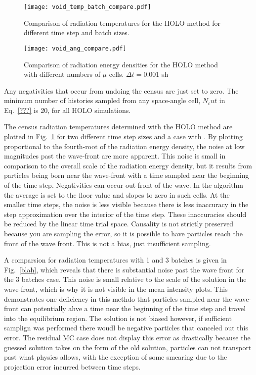 \begin{figure}[H]
  \centering
    \texttt{[image: void\_temp\_batch\_compare.pdf]}
    \caption{\label{fig:void_temp_compare} Comparison of radiation temperatures for the
    HOLO method for different time step and batch sizes.}
\end{figure}

\begin{figure}[H]
  \centering
    \texttt{[image: void\_ang\_compare.pdf]}
    \caption{\label{fig:bumps} Comparison of radiation energy densities for
    the HOLO method with different numbers of $\mu$ cells. $\Delta t=0.001$ sh}
\end{figure}


Any negativities that occur from undoing the census are just set to zero.  The minimum
number of histories sampled from any space-angle cell, $N_cut$ in Eq.~\eqref{???} is 20,
for all HOLO simulations.

The census radiation temperatures determined with the HOLO method are plotted in
Fig.~\ref{fig:void_temp_compare} for two different
time step sizes and a case with .  By plotting
proportional to the fourth-root of the radiation energy density, the noise at low
magnitudes past the wave-front are more apparent.  This noise is small in comparison to the overall scale of the radiation energy
density, but it results from particles being born near the wave-front with a time sampled
near the beginning of the time step.  Negativities can occur out front of the wave.  In
the algorithm the average is set to the floor value and slopes to zero in such cells.  At
the smaller time steps, the noise is less visible because there is less inaccuracy in the
step approximation over the interior of the time step.  These inaccuracies should be
reduced by the linear time trial space. Causality is not strictly
preserved because you are sampling the error, so it is possible to have particles reach
the front of the wave front. This is not a bias, just insufficient sampling.

A comparsion for radiation temperatures with 1 and 3 batches is given in Fig.~\ref{blah}, which
reveals that there is substantial noise past the wave front for the 3 batches case.  This
noise is small relative to the scale of the solution in the wave-front, which is why it is not visible in the
mean intensity plots. This demonstrates one deficiency in this methdo that particles
sampled near the wave-front can potentially ahve a time near the beginning of the time
step and travel into the equilibrium region.  The solution is not biased however, if
sufficient samplign was performed there woudl be negative particles that canceled out this
error.  The residual MC case does not display this error as drastically because the guessed solution
takes on the form of the old solution, particles can not transport past what physics
allows, with the exception of some smearing due to the projection error incurred between
time steps.

